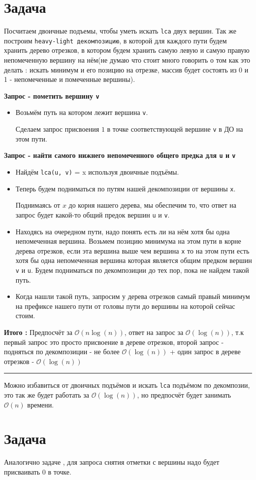 \documentclass{article}
\begin{document}
\section*{Задача }
Посчитаем двоичные подъемы, чтобы уметь искать \texttt{lca} двух вершин. Так же построим \texttt{heavy-light декомпозицию}, в которой для каждого пути будем хранить дерево отрезков, в котором будем хранить самую левую и самую правую непомеченную вершину на нём(не думаю что стоит много говорить о том как это делать : искать минимум и его позицию на отрезке, массив будет состоять из 0 и 1 - непомеченные и помеченные вершины).\newpage

\textbf{Запрос - пометить вершину \texttt{v}}

\begin{itemize}

\item Возьмём путь на котором лежит вершина \texttt{v}.

 Сделаем запрос присвоения $1$ в точке соответствующей вершине \texttt{v} в ДО на этом пути.
\end{itemize}


\textbf{Запрос - найти самого нижнего непомеченного общего предка для  \texttt{u} и \texttt{v}}

\begin{itemize}

\item Найдём \texttt{lca(u, v)} = x используя двоичные подъёмы.
\item Теперь будем подниматься по путям нашей декомпозиции от вершины \texttt{x}. 

Поднимаясь от $x$ до корня нашего дерева, мы обеспечим то, что ответ на запрос будет какой-то общий предок вершин \texttt{u} и \texttt{v}.
\item Находясь на очередном пути, надо понять есть ли на нём хотя бы одна непомеченная вершина. Возьмем позицию минимума на этом пути в корне дерева отрезков, если эта вершина выше чем вершина \texttt{x} то на этом пути есть хотя бы одна непомеченная вершина которая является общим предком вершин \texttt{v} и \texttt{u}. Будем подниматься по декомпозиции до тех пор, пока не найдем такой путь.
\item Когда нашли такой путь, запросим у дерева отрезков самый правый минимум на префиксе нашего пути от головы пути до вершины на которой сейчас стоим. 

\end{itemize}
\textbf{Итого : }
Предпосчёт за $\mathcal{O}(n\log(n))$, ответ на запрос за $\mathcal{O}(\log(n))$, т.к первый запрос это просто присвоение в дереве отрезков, второй запрос - подняться по декомпозиции - не более $\mathcal{O}(\log(n))$ + один запрос в дереве отрезков - $\mathcal{O}(\log(n))$

\noindent\rule{\textwidth}{0.5pt}
Можно избавиться от двоичных подъёмов и искать \texttt{lca} подъёмом по декомпозии, это так же будет работать за $\mathcal{O}(\log(n))$, но предпосчёт будет занимать $\mathcal{O}(n)$ времени.
\section*{Задача }
Аналогично задаче , для запроса снятия отметки с вершины надо будет присваивать 0 в точке.
\end{document}
